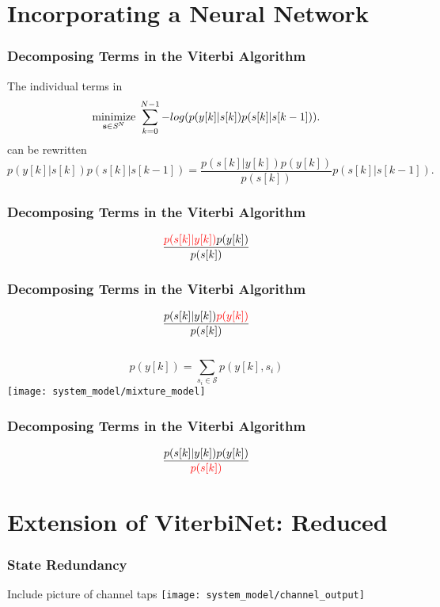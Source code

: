 \documentclass[10pt,tgadventor, onlymath]{beamer}
\begin{document}
\section{Incorporating a Neural Network}

\begin{frame}
\frametitle{Decomposing Terms in the Viterbi Algorithm}
The individual terms in
\begin{equation*}\label{opt_problem}
\underset{\mathbf{s}\in\textit{\cal{S}}^N}{\text{minimize}}\; \sum_{k=0}^{N-1} -log(p(y[k]|s[k])p(s[k]|s[k-1])).
\end{equation*}
can be rewritten 
\begin{equation*}
p(y[k]|s[k])p(s[k]|s[k-1]) = \frac{p(s[k]|y[k])p(y[k])}{p(s[k])}p(s[k]|s[k-1]).
\end{equation*}
\end{frame}

\begin{frame}
	\frametitle{Decomposing Terms in the Viterbi Algorithm}
\begin{equation*}
\frac{\textcolor{red}{p(s[k]|y[k])}p(y[k])}{p(s[k])}
\end{equation*}
\begin{figure}[H]
	
\end{figure}
\end{frame}

\begin{frame}
	\frametitle{Decomposing Terms in the Viterbi Algorithm }
\begin{equation*}
\frac{p(s[k]|y[k])\textcolor{red}{p(y[k])}}{p(s[k])}
\end{equation*}
\\
\begin{equation*}
p(y[k]) = \sum_{s_i \in \mathcal{S}} p(y[k],s_i)
\end{equation*}
\centering
	\texttt{[image: system\_model/mixture\_model]}

\end{frame}

\begin{frame}
	\frametitle{Decomposing Terms in the Viterbi Algorithm}
\begin{equation*}
\frac{p(s[k]|y[k])p(y[k])}{\textcolor{red}{p(s[k])}}
\end{equation*}
\end{frame}



\section{Extension of ViterbiNet: Reduced}
\begin{frame}
	\frametitle{State Redundancy}
Include picture of channel taps
\centering
		\texttt{[image: system\_model/channel\_output]}

\end{frame}
\end{document}
